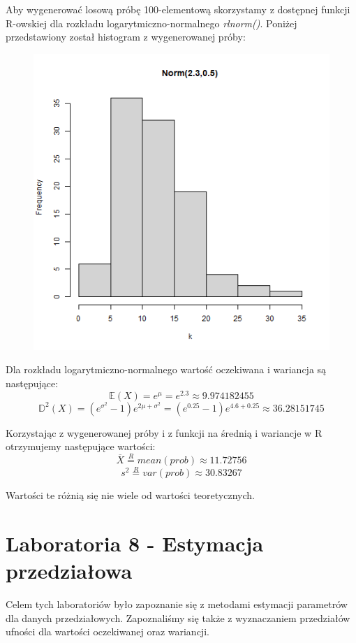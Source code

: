 \documentclass{article}
\begin{document}
Aby wygenerować losową próbę 100-elementową skorzystamy z dostępnej funkcji R-owskiej dla rozkładu logarytmiczno-normalnego \textit{rlnorm()}. Poniżej przedstawiony został histogram z wygenerowanej próby:
\begin{figure}[h!]
\begin{center}
\includegraphics[height = 0.4\textheight, angle = 0]{"lab7zad7.png"}
\end{center}
\end{figure}

Dla rozkładu logarytmiczno-normalnego wartość oczekiwana i wariancja są następujące:
\[ \mathbb{E}(X) = e^\mu = e^2.3 \approx 9.974182455 \]
\[ \mathbb{D}^2(X) = (e^{\sigma^2} - 1)e^{2\mu+\sigma^2} = (e^{0.25}-1)e^{4.6 + 0.25} \approx 36.28151745 \]

Korzystając z wygenerowanej próby i z funkcji na średnią i wariancje w R otrzymujemy następujące wartości:
\[ \overline{X} \overset{R}{=} mean(prob) \approx 11.72756 \]
\[ s^2 \overset{R}{=} var(prob) \approx 30.83267 \]

Wartości te różnią się nie wiele od wartości teoretycznych.

\newpage
\part{Laboratoria 8 - Estymacja przedziałowa}
Celem tych laboratoriów było zapoznanie się z metodami estymacji parametrów dla danych przedziałowych. Zapoznaliśmy się także z wyznaczaniem przedziałów ufności dla wartości oczekiwanej oraz wariancji.
\end{document}
